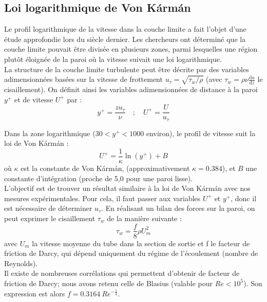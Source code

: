 \documentclass[12pt, a4paper]{report}
\begin{document}
	\subsection{Loi logarithmique de Von Kármán}
	Le profil logarithmique de la vitesse dans la couche limite a fait l'objet d'une étude approfondie lors du siècle dernier. Les chercheurs ont déterminé que la couche limite pouvait être divisée en plusieurs zones, parmi lesquelles une région plutôt éloignée de la paroi où la vitesse suivait une loi logarithmique.\\
	
	\noindent La structure de la couche limite turbulente peut être décrite par des variables adimensionnées basées sur la vitesse de frottement $u_\tau = \sqrt{\tau_w / \rho}$ (avec $\tau_w = \rho \nu \frac{\text{d}u}{\text{d}z}$ le cisaillement). On définit ainsi les variables adimensionnées de distance à la paroi $y^+$ et de vitesse $U^+$ par :
	\begin{equation*}
		y^+ = \frac{z u_\tau}{\nu} \quad ; \quad U^+ = \frac{U}{u_\tau}
	\end{equation*}
	
	\noindent Dans la zone logarithmique ($30 < y^+ < 1000$ environ), le profil de vitesse suit la loi de Von Kármán :
	\begin{equation*}
		\boxed{U^+ = \frac{1}{\kappa} \ln(y^+) + B}
	\end{equation*}
	où $\kappa$ est la constante de Von Kármán, (approximativement $\kappa = 0.384$), et $B$ une constante d'intégration (proche de 5,0 pour une paroi lisse).\\
	
	\noindent L'objectif est de trouver un résultat similaire à la loi de Von Kármán avec nos mesures expérimentales. Pour cela, il faut passer aux variables $U^+$ et $y^+$, donc il est nécessaire de déterminer $u_\tau$. En réalisant un bilan des forces sur la paroi, on peut exprimer le cisaillement $\tau_w$ de la manière suivante :
	\begin{equation*}
		\tau_w = \frac{f}{8}\rho U_m^2
	\end{equation*} 
	avec $U_m$ la vitesse moyenne du tube dans la section de sortie et f le facteur de friction de Darcy, qui dépend uniquement du régime de l'écoulement (nombre de Reynolds).\\
	
	\noindent Il existe de nombreuses corrélations qui permettent d'obtenir de facteur de friction de Darcy; nous avons retenu celle de Blasius (valable pour $Re < 10^5$). Son expression est alors $f = 0.3164 \: Re^{-\frac{1}{4}}$.\\
	
\end{document}
